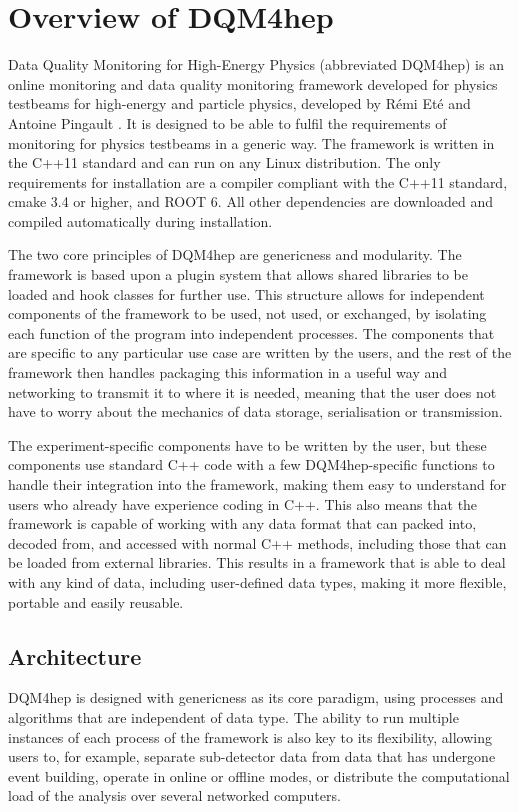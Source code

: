 \section{Overview of DQM4hep}
Data Quality Monitoring for High-Energy Physics (abbreviated \acrshort{DQM4hep}) is an online monitoring and data quality monitoring framework developed for physics testbeams for high-energy and particle physics, developed by R\'{e}mi Et\'{e} and Antoine Pingault \cite{aida2020-milestone-dqm4hep}. It is designed to be able to fulfil the requirements of monitoring for physics testbeams in a generic way. The framework is written in the C++11 standard and can run on any Linux distribution. The only requirements for installation are a compiler compliant with the C++11 standard, cmake 3.4 or higher, and ROOT 6. All other dependencies are downloaded and compiled automatically during installation. 

The two core principles of \acrshort{DQM4hep} are genericness and modularity. The framework is based upon a plugin system that allows shared libraries to be loaded and hook classes for further use. This structure allows for independent components of the framework to be used, not used, or exchanged, by isolating each function of the program into independent processes. The components that are specific to any particular use case are written by the users, and the rest of the framework then handles packaging this information in a useful way and networking to transmit it to where it is needed, meaning that the user does not have to worry about the mechanics of data storage, serialisation or transmission. 

The experiment-specific components have to be written by the user, but these components use standard C++ code with a few \acrshort{DQM4hep}-specific functions to handle their integration into the framework, making them easy to understand for users who already have experience coding in C++. This also means that the framework is capable of working with any data format that can packed into, decoded from, and accessed with normal C++ methods, including those that can be loaded from external libraries. This results in a framework that is able to deal with any kind of data, including user-defined data types, making it more flexible, portable and easily reusable.

\subsection{Architecture}
\acrshort{DQM4hep} is designed with genericness as its core paradigm, using processes and algorithms that are independent of data type. The ability to run multiple instances of each process of the framework is also key to its flexibility, allowing users to, for example, separate sub-detector data from data that has undergone event building, operate in online or offline modes, or distribute the computational load of the analysis over several networked computers.

